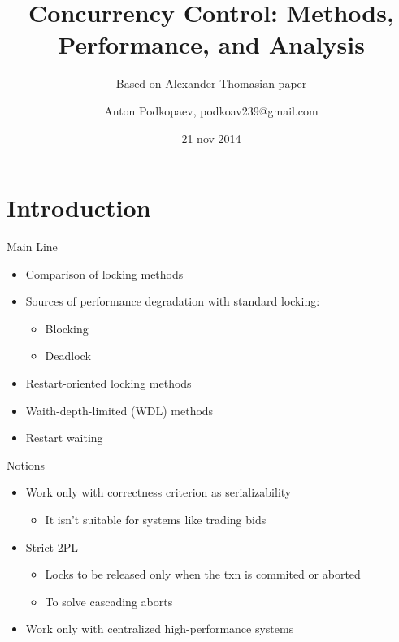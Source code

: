 \documentclass[sans]{beamer}
\begin{document}
\title
[Concurrency Control]
{Concurrency Control: Methods, Performance, and Analysis}

\subtitle{Based on Alexander Thomasian paper}

\author
[Podkopaev]{Anton Podkopaev, podkoav239@gmail.com}
\date [21-11-14]{21 nov 2014}

\begin{frame}[plain]
	\titlepage
\end{frame}

\section{Introduction}

\begin{frame}{Main Line}
  \begin{itemize}
    \item Comparison of locking methods

    \item Sources of performance degradation with standard locking:
      \begin{itemize}
        \item Blocking
        \item Deadlock
      \end{itemize}

    \item Restart-oriented locking methods
    \item Waith-depth-limited (WDL) methods

    \item Restart waiting
  \end{itemize}
\end{frame}

\begin{frame}{Notions}
  \begin{itemize}
    \item Work only with correctness criterion as serializability
    \begin{itemize}
      \item It isn't suitable for systems like trading bids
    \end{itemize}
    
    \item Strict 2PL
    \begin{itemize}
      \item Locks to be released only when the txn is
            commited or aborted
      \item To solve cascading aborts
    \end{itemize}

    \item Work only with centralized high-performance systems
  \end{itemize}
\end{frame}
\end{document}

